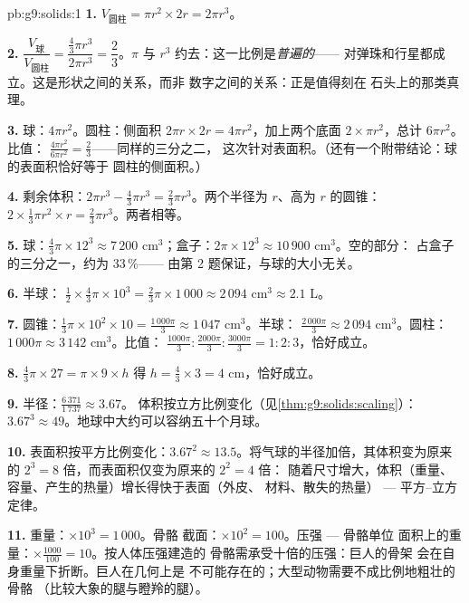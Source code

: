 \begin{solution}{pb:g9:solids:1}
\textbf{1.} $V_{\text{圆柱}} = \pi r^2 \times 2r = 2\pi r^3$。

\textbf{2.} $\dfrac{V_{\text{球}}}{V_{\text{圆柱}}}
= \dfrac{\frac43 \pi r^3}{2 \pi r^3} = \dfrac23$。$\pi$ 与
$r^3$ 约去：这一比例是\emph{普遍的}——
对弹珠和行星都成立。这是形状之间的关系，而非
数字之间的关系：正是值得刻在
石头上的那类真理。

\textbf{3.} 球：$4\pi r^2$。圆柱：侧面积
$2\pi r \times 2r = 4\pi r^2$，加上两个底面
$2 \times \pi r^2$，总计 $6\pi r^2$。比值：
$\frac{4\pi r^2}{6\pi r^2} = \frac23$——同样的三分之二，
这次针对表面积。（还有一个附带结论：球的表面积恰好等于
圆柱的侧面积。）

\textbf{4.} 剩余体积：$2\pi r^3 - \frac43\pi r^3 =
\frac23 \pi r^3$。两个半径为 $r$、高为 $r$ 的圆锥：
$2 \times \frac13 \pi r^2 \times r = \frac23 \pi r^3$。两者相等。

\textbf{5.} 球：$\frac43 \pi \times 12^3 \approx 7\,200$
cm$^3$；盒子：$2\pi \times 12^3 \approx 10\,900$ cm$^3$。空的部分：
占盒子的三分之一，约为 $33\,\%$——
由第 2 题保证，与球的大小无关。

\textbf{6.} 半球：
$\frac12 \times \frac43 \pi \times 10^3 = \frac23 \pi \times
1\,000 \approx 2\,094$ cm$^3 \approx 2.1$ L。

\textbf{7.} 圆锥：$\frac13 \pi \times 10^2 \times 10 =
\frac{1\,000\pi}{3} \approx 1\,047$ cm$^3$。半球：
$\frac{2\,000\pi}{3} \approx 2\,094$ cm$^3$。圆柱：
$1\,000\pi \approx 3\,142$ cm$^3$。比值：
$\frac{1000\pi}{3} : \frac{2000\pi}{3} : \frac{3000\pi}{3}
= 1 : 2 : 3$，恰好成立。

\textbf{8.} $\frac43 \pi \times 27 = \pi \times 9 \times h$
得 $h = \frac43 \times 3 = 4$ cm，恰好成立。

\textbf{9.} 半径：$\frac{6\,371}{1\,737} \approx 3.67$。
体积按立方比例变化（见\cref{thm:g9:solids:scaling}）：
$3.67^3 \approx 49$。地球中大约可以容纳五十个月球。

\textbf{10.} 表面积按平方比例变化：$3.67^2 \approx
13.5$。将气球的半径加倍，其体积变为原来的
$2^3 = 8$ 倍，而表面积仅变为原来的 $2^2 = 4$ 倍：
随着尺寸增大，体积（重量、容量、产生的热量）增长得快于表面（外皮、
材料、散失的热量） --- 平方--立方定律。

\textbf{11.} 重量：$\times 10^3 = 1\,000$。骨骼
截面：$\times 10^2 = 100$。压强 --- 骨骼单位
面积上的重量：$\times \frac{1000}{100} = 10$。按人体压强建造的
骨骼需承受十倍的压强：巨人的骨架
会在自身重量下折断。巨人在几何上是
不可能存在的；大型动物需要不成比例地粗壮的骨骼
（比较大象的腿与瞪羚的腿）。


\end{solution}
